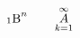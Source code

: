 \documentclass{book}
\begin{document}
$$\sideset{_1}{^{n}}{\mathop{\mathrm{B}}}
\qquad \mathop{A}^{\infty}_{k=1}$$
\end{document}
